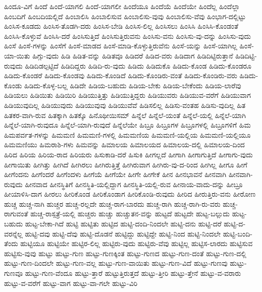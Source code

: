 {ಹಿಂದೂ-ವಿಗೆ
ಹಿಂದೆ
ಹಿಂದೆ-ಯಾಗಲಿ
ಹಿಂದೆ-ಯಾಗಲೀ
ಹಿಂದೆಯೂ
ಹಿಂದೆಯೆ
ಹಿಂದೆಯೇ
ಹಿಂದೆಲ್ಲ
ಹಿಂದೆಲ್ಲಾ
ಹಿಂಬದಿಗೆ
ಹಿಂಬದಿಯಲ್ಲಿದೆ
ಹಿಂಬಾಲಿಸಿ
ಹಿಂಬಾಲಿಸುವ
ಹಿಂಬಾಲಿಸು-ವುವು
ಹಿಂಬಾಲಿಸು-ವೆವು
ಹಿಂಭಾಗ-ದಲ್ಲಿಟ್ಟು
ಹಿಂಸಿಸ-ಕೂಡದು
ಹಿಂಸಿಸ-ತೊಡಗಿ-ದರು
ಹಿಂಸಿಸ-ಬೇಡಿ
ಹಿಂಸಿಸ-ಲಿಲ್ಲ
ಹಿಂಸಿಸಲು
ಹಿಂಸಿಸಿ
ಹಿಂಸಿಸಿ-ಕೊಂಡಂತೆ
ಹಿಂಸಿಸಿ-ಕೊಳ್ಳುವೆ
ಹಿಂಸಿಸಿ-ದರೆ
ಹಿಂಸಿಸುತ್ತಿದೆ
ಹಿಂಸಿಸುತ್ತಿರುವನು
ಹಿಂಸಿಸು-ವನು
ಹಿಂಸಿಸು-ವು-ದನ್ನು
ಹಿಂಸಿಸು-ವುದು
ಹಿಂಸೆ
ಹಿಂಸೆ-ಗಳನ್ನು
ಹಿಂಸೆಗೆ
ಹಿಂಸೆ-ಮಾಡದ
ಹಿಂಸೆ-ಮಾಡಿ-ಕೊಳ್ಳುತ್ತಿರುವೆನು
ಹಿಂಸೆ-ಯನ್ನು
ಹಿಂಸೆ-ಯಾಗಿಲ್ಲ
ಹಿಂಸೆ-ಯಾ-ಯಿತು
ಹಿಗ್ಗು-ವುದು
ಹಿಡಿ
ಹಿಡಿತ-ವನ್ನು
ಹಿಡಿತವೂ
ಹಿಡಿದರೆ
ಹಿಡಿದ-ವರು
ಹಿಡಿದಾಗ
ಹಿಡಿದಿಟ್ಟಿರುತ್ತಾನೆ
ಹಿಡಿದಿಟ್ಟಿ-ರುವುದು
ಹಿಡಿದಿಡಲ್ಪಟ್ಟಿದೆ
ಹಿಡಿದಿದ್ದರು
ಹಿಡಿದಿ-ರು-ವುದು
ಹಿಡಿದು
ಹಿಡಿದುಕೊ
ಹಿಡಿದು-ಕೊಂಡ
ಹಿಡಿದು-ಕೊಂಡರೂ
ಹಿಡಿದು-ಕೊಂಡರೆ
ಹಿಡಿದು-ಕೊಂಡವು
ಹಿಡಿದು-ಕೊಂಡಿದೆ
ಹಿಡಿದು-ಕೊಂಡಿರು-ವಂತೆ
ಹಿಡಿದು-ಕೊಂಡಿರು-ವರು
ಹಿಡಿದು-ಕೊಂಡು
ಹಿಡಿದು-ಕೊಳ್ಳ-ಬಲ್ಲ
ಹಿಡಿದೇ
ಹಿಡಿಯ-ಬಹುದು
ಹಿಡಿಯ-ಬೇಕು
ಹಿಡಿಯ-ಬೇಕೆಂದು
ಹಿಡಿಯ-ಲಾರೆವು
ಹಿಡಿಯಲು
ಹಿಡಿಯಿತು
ಹಿಡಿಯಿರಿ
ಹಿಡಿಯುತ್ತಿತ್ತು
ಹಿಡಿಯುತ್ತಿದ್ದರು
ಹಿಡಿಯುವರು
ಹಿಡಿಯುವ-ವರೆಗೆ
ಹಿಡಿಯುವಾಗ
ಹಿಡಿಯುವುದಿಲ್ಲ
ಹಿಡಿಯುವುದು
ಹಿಡಿಯುವುವು
ಹಿಡಿಯುವೆವೆ
ಹಿಡಿಸಲಿಲ್ಲ
ಹಿಡಿಸು-ವಂತಹ
ಹಿಡಿಸು-ವುದಿಲ್ಲ
ಹಿತ
ಹಿತಕರ-ವಾಗಿ-ರುವ
ಹಿತಕ್ಕಾಗಿ
ಹಿತಕ್ಕೊ
ಹಿನೊಥೀಯಿಸಮ್
ಹಿನ್ನೆಲೆ
ಹಿನ್ನೆಲೆ-ಯಂತೆ
ಹಿನ್ನೆಲೆ-ಯಲ್ಲಿ
ಹಿನ್ನೆಲೆ-ಯಾಗಿ
ಹಿನ್ನೆಲೆ-ಯಾಗಿ-ರುವುದೂ
ಹಿನ್ನೆಲೆ-ಯಾಗಿ-ರುವುದೆ
ಹಿನ್ನೆಲೆಯೇ
ಹಿಬ್ರೂ
ಹಿಬ್ರೂಗಳ
ಹಿಬ್ರೂಗಳಲ್ಲಿ
ಹಿಬ್ರೂಗಳಿಗೆ
ಹಿಮ
ಹಿಮಪರ್ವತ-ಗಳನ್ನು
ಹಿಮಮಣಿ
ಹಿಮಮಣಿ-ಗಳಲ್ಲಿ
ಹಿಮಮಣಿಯ
ಹಿಮಮಣಿ-ಯಲ್ಲಿಯ
ಹಿಮಮಣಿ-ಯಲ್ಲಿಯೂ
ಹಿಮಮಣಿಯು
ಹಿಮರಾಶಿ-ಗಳು
ಹಿಮವನ್ನು
ಹಿಮಾಲಯ
ಹಿಮಾಲಯದ
ಹಿಮಾಲಯ-ದಲ್ಲಿ
ಹಿಮಾಲಯ-ದಿಂದ
ಹಿರಿದ
ಹಿರಿಯ
ಹಿರಿಯ-ರಾದ
ಹಿರಿಯರು
ಹಿಸುಕಾಡಿ-ದರೆ
ಹಿಸುಕಿ
ಹೀಗಲ್ಲದೆ
ಹೀಗಾಗಿ
ಹೀಗಾಗುತ್ತಿದೆ
ಹೀಗಾಗು-ವುದು
ಹೀಗಾಯಿತು
ಹೀಗಿತ್ತು
ಹೀಗಿದೆ
ಹೀಗಿರಲು
ಹೀಗಿರುತ್ತಿತ್ತೆ
ಹೀಗಿರುವಾಗ
ಹೀಗಿರು-ವು-ದ-ರಿಂದ
ಹೀಗಿಲ್ಲ
ಹೀಗೂ
ಹೀಗೆ
ಹೀಗೆಂದನು
ಹೀಗೆಂದರೆ
ಹೀಗೆಂದಳು
ಹೀಗೆಯೆ
ಹೀಗೆಯೇ
ಹೀಗೇ
ಹೀಗೇಕೆ
ಹೀನ
ಹೀನಭಾವನೆ
ಹೀನವಾಗಿ
ಹೀನವಾಗಿ-ರುವುದು
ಹೀನವಾದ
ಹೀನಸ್ಥಿತಿಗೆ
ಹೀನಸ್ಥಿತಿ-ಯಲ್ಲಿದ್ದಾಗ
ಹೀನಸ್ಥಿತಿ-ಯಲ್ಲಿ-ರುವ
ಹೀನಾಯ-ವಾದು-ದನ್ನು
ಹೀಬ್ರೂ
ಹೀಯಾಳಿಸಿ-ದಾಗ
ಹೀರಲು
ಹೀರಿಕೊಂಡ
ಹೀರಿಕೊಂಡಾಗ
ಹೀರಿಕೊಂಡಿ-ರುವುದು
ಹೀರಿದ
ಹೀರುತ್ತಿರು-ವನು
ಹೀರೋಣ
ಹುಚ್ಚ
ಹುಚ್ಚ-ನಾಗಿ
ಹುಚ್ಚರ
ಹುಚ್ಚ-ರಲ್ಲದೇ
ಹುಚ್ಚ-ರಾಗ-ಬಾರದು
ಹುಚ್ಚ-ರಾಗಿ
ಹುಚ್ಚ-ರಾಗಿ-ರು-ವರು
ಹುಚ್ಚ-ರಾಗುವಂತೆ
ಹುಚ್ಚ-ರಾಸ್ಪತ್ರೆ-ಯಲ್ಲಿ
ಹುಚ್ಚರು
ಹುಚ್ಚು
ಹುಚ್ಚುತನ-ವನ್ನು
ಹುಟ್ಟದೆ
ಹುಟ್ಟದೇ
ಹುಟ್ಟ-ಬಲ್ಲುದು
ಹುಟ್ಟ-ಬಹುದು
ಹುಟ್ಟ-ಬೇಕಾ-ಗಿದೆ
ಹುಟ್ಟಿ
ಹುಟ್ಟಿತು
ಹುಟ್ಟಿದ
ಹುಟ್ಟಿ-ದಂದಿ-ನಿಂದಲೇ
ಹುಟ್ಟಿ-ದನು
ಹುಟ್ಟಿ-ದರೆ
ಹುಟ್ಟಿ-ದ-ವರನ್ನೆಲ್ಲ
ಹುಟ್ಟಿ-ದವು
ಹುಟ್ಟಿ-ದೆವು
ಹುಟ್ಟಿ-ದೊಡನೆ
ಹುಟ್ಟಿದ್ದು
ಹುಟ್ಟಿದ್ದೇ
ಹುಟ್ಟಿ-ನಿಂದ
ಹುಟ್ಟಿ-ನಿಂದಲೇ
ಹುಟ್ಟಿ-ಬಂದಿ-ತೆಂದು
ಹುಟ್ಟಿಯೂ
ಹುಟ್ಟಿಯೇ
ಹುಟ್ಟಿರ-ಲಿಲ್ಲ
ಹುಟ್ಟಿರು-ವುದು
ಹುಟ್ಟಿರು-ವೆವು
ಹುಟ್ಟಿಲ್ಲ
ಹುಟ್ಟಿಸ-ಲಾರದು
ಹುಟ್ಟಿಸುವ
ಹುಟ್ಟಿಸು-ವುವು
ಹುಟ್ಟು
ಹುಟ್ಟು-ಗುಣ
ಹುಟ್ಟು-ಗುಣಕ್ಕಿಂತ
ಹುಟ್ಟು-ಗುಣದ
ಹುಟ್ಟು-ಗುಣ-ದಂತೆ
ಹುಟ್ಟು-ಗುಣ-ದಲ್ಲಿ
ಹುಟ್ಟು-ಗುಣ-ದಿಂದಲೇ
ಹುಟ್ಟು-ಗುಣ-ವಲ್ಲ
ಹುಟ್ಟು-ಗುಣ-ವಾಯಿತು
ಹುಟ್ಟು-ಗುಣ-ವಿದೆ
ಹುಟ್ಟು-ಗುಣವು
ಹುಟ್ಟು-ಗುಣವೂ
ಹುಟ್ಟು-ಗುಣ-ವೆಂದೂ
ಹುಟ್ಟು-ತ್ತಾರೆ
ಹುಟ್ಟುತ್ತಿರುತ್ತದೆ
ಹುಟ್ಟು-ತ್ತೀರಿ
ಹುಟ್ಟು-ತ್ತೇನೆ
ಹುಟ್ಟು-ವ-ವರಾರು
ಹುಟ್ಟು-ವ-ವರೆಗೆ
ಹುಟ್ಟು-ವಾಗ
ಹುಟ್ಟು-ವಾ-ಗಲೇ
ಹುಟ್ಟು-ವಿರಿ
}
